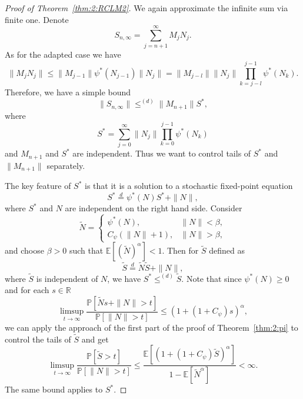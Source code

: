\documentclass[preprint,12pt]{elsarticle}
\theoremstyle{definition}
\theoremstyle{remark}
\newcommand{\Mbf}{{ M}}
\newcommand{\Nbf}{{ N}}
\newcommand{\Sbf}{{ S}}
\newcommand{\1}{{\mathbf 1}}
\numberwithin{equation}{section}
\newcommand{\Ebb}{\mathbb{E}}  %
\newcommand{\E}{\mathbb{E}}  %
\begin{document}
	\begin{proof}[Proof of Theorem~\ref{thm:2:RCLM2}]
		We again approximate the infinite sum via finite one. Denote
		\begin{equation*}
			\Sbf_{n,\infty} = \sum_{j =n+1}^\infty \Mbf_j\Nbf_j.
		\end{equation*}
		As for the adapted case we have
		\begin{equation*}
			\|\Mbf_j\Nbf_j\| \leq 
			\|\Mbf_{j-1} \| \psi^*( \Nbf_{j-1}) \|\Nbf_j\|
			= \|\Mbf_{j-l}\| \|\Nbf_j\| \prod_{k=j-l}^{j-1} \psi^*(\Nbf_k).
		\end{equation*}
		Therefore, we have a simple bound
		\begin{equation*}
			\|\Sbf_{n, \infty}\| \leq^{(d)} \| \Mbf_{n+1}\| \Sbf^*,
		\end{equation*}
		where
		\begin{equation*}
			\Sbf^* = \sum_{j=0}^\infty \|\Nbf_j\| \prod_{k=0}^{j-1} \psi^*(\Nbf_k)
		\end{equation*}
        and $\Mbf_{n+1}$ and $\Sbf^*$ are independent.
        Thus we want to control tails of $\Sbf^*$ and $\|\Mbf_{n+1}\|$ separately.
        
		The key feature of $\Sbf^*$ is that it is a solution to a stochastic fixed-point equation
		\begin{equation*}
			\Sbf^* \stackrel{d}{=} \psi^*(\Nbf)\Sbf^*+\|\Nbf\|,
		\end{equation*}
		where $\Sbf^*$ and $\Nbf$ are independent on the right hand side.
        Consider
        \begin{equation*}
            \tilde{N} = 
            \begin{cases}
                \psi^*(\Nbf), & \|\Nbf\| < \beta,\\
                C_{\psi} (\|\Nbf\| + 1), & \|\Nbf\| > \beta,
            \end{cases}
        \end{equation*}
        and choose $\beta > 0$ such that $\E[(\tilde{N})^\alpha] < 1$.
        Then for $\tilde{\Sbf}$ defined as
        $$\tilde{\Sbf} \stackrel{d}{=} \tilde{N} \tilde{\Sbf} + \|\Nbf\|,$$
        where $\tilde{\Sbf}$ is independent of $\Nbf$,
        we have $\Sbf^* \leq^{(d)} \tilde{\Sbf}$.
        Note that since $\psi^*(\Nbf) \geq 0$
		and for each $s \in \mathbb{R}$
		\begin{equation*}
			\limsup_{t \to \infty} \frac{ \mathbb{P}[ \tilde{N} s + \|\Nbf\| >t]}{\mathbb{P}[\|\Nbf\|>t]}
			\leq (1 + ( 1 + C_{\psi} ) s )^\alpha,
		\end{equation*}
		we can apply the approach of the first part of the proof of Theorem~\ref{thm:2:pi} to control the tails of 
		$\tilde{\Sbf}$ and get
		\begin{equation*}
			\limsup_{t \to \infty} \frac{\mathbb{P}[\tilde{\Sbf}>t]}{\mathbb{P}[\|\Nbf\|>t]} 
			\leq \frac{\Ebb[ (1+(1+ C_{\psi} )\tilde{\Sbf})^\alpha]}{1-\Ebb[\tilde{\Nbf}^\alpha]} <\infty.
		\end{equation*}
        The same bound applies to $\Sbf^*$.
    

\end{proof}
\end{document}
